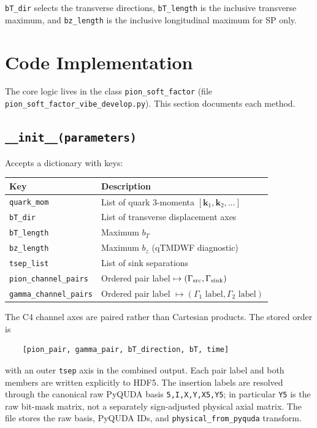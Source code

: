 \documentclass[11pt,a4paper]{article}
\newcommand{\walltag}[1]{\texttt{#1}}
\begin{document}
\walltag{bT\_dir} selects the transverse directions,
\walltag{bT\_length} is the inclusive transverse maximum, and
\walltag{bz\_length} is the inclusive longitudinal maximum for SP only.


\section{Code Implementation}

The core logic lives in the class \walltag{pion\_soft\_factor} (file
\walltag{pion\_soft\_factor\_vibe\_develop.py}).  This section documents each method.

\subsection{\walltag{\_\_init\_\_(parameters)}}

Accepts a dictionary with keys:

\begin{center}
\begin{tabular}{ll}
\toprule
Key & Description \\
\midrule
\walltag{quark\_mom} & List of quark 3-momenta $[\mathbf{k}_{1}, \mathbf{k}_{2}, \dots]$ \\
\walltag{bT\_dir}    & List of transverse displacement axes \\
\walltag{bT\_length} & Maximum $b_{T}$ \\
\walltag{bz\_length} & Maximum $b_{z}$ (qTMDWF diagnostic) \\
\walltag{tsep\_list} & List of sink separations \\
\walltag{pion\_channel\_pairs} & Ordered pair label $\mapsto(\Gamma_{\rm src},\Gamma_{\rm sink})$ \\
\walltag{gamma\_channel\_pairs} & Ordered pair label $\mapsto(\Gamma_1\text{ label},\Gamma_2\text{ label})$ \\
\bottomrule
\end{tabular}
\end{center}

The C4 channel axes are paired rather than Cartesian products. The stored order is
\begin{verbatim}
    [pion_pair, gamma_pair, bT_direction, bT, time]
\end{verbatim}
with an outer \texttt{tsep} axis in the combined output. Each pair label and both members
are written explicitly to HDF5.  The insertion labels are resolved through the
canonical raw PyQUDA basis
\texttt{5,I,X,Y,X5,Y5}; in particular \texttt{Y5} is the raw bit-mask matrix,
not a separately sign-adjusted physical axial matrix.  The file stores the raw
basis, PyQUDA IDs, and \texttt{physical\_from\_pyquda} transform.
\end{document}
